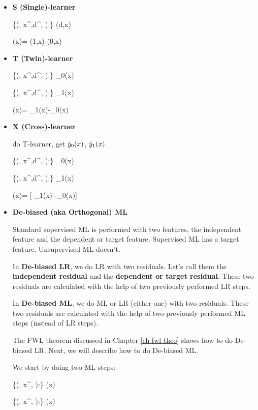\begin{itemize}
\item {\bf S (Single)-learner}

\beq
\{(\s, x^\s,d^\s,  ):\s\in \Sigma\}
\mlarr \haty(d,x)
\eeq

\beq
\delta(x)= \haty(1,x)-\haty(0,x)
\eeq

\item {\bf T (Twin)-learner}

\beq
\{(\s, x^\s,d^,  ):\s\in \Sigma\}
\mlarr \haty_0(x)
\eeq

\beq
\{(\s, x^\s,d^,  ):\s\in \Sigma\}
\mlarr \haty_1(x)
\eeq

\beq
\delta(x)= \haty_1(x)-\haty_0(x)
\eeq

\item {\bf X (Cross)-learner}

do T-learner, get ${\hat{y}}_0(x)$, ${\hat{y}}_1(x)$


\beq
\{(\s, x^\s,d^, ):\s\in \Sigma\}
\mlarr \caly_0(x)
\eeq

\beq
\{(\s, x^\s,d^, ):\s\in \Sigma\}
\mlarr \caly_1(x)
\eeq

\beq
\delta(x)= [
\caly_1(x) -\caly_0(x)]
\eeq

\item {\bf De-biased (aka Orthogonal) ML}

Standard supervised ML is performed with two features,
the independent feature and the dependent or target feature.
Supervised ML has a target feature. Unsupervised ML doesn't.


In {\bf De-biased LR}, we
do LR
with two residuals. Let's call them
the {\bf independent residual} and the
{\bf dependent or target residual}.
These  two residuals are calculated
with the help of two previously
performed LR steps.


In {\bf De-biased ML},
we do ML or LR (either one) with two residuals.
These  two residuals are calculated
with the help of two previously
performed ML steps (instead of LR steps).

The FWL theorem
discussed in Chapter \ref{ch-fwl-theo}
shows how to do De-biased LR. Next,
we will describe how to 
do De-biased ML.

We start by doing two ML steps:

\beq
\{(\s, x^\s, ):\s\in \Sigma\}
\mlarr {}(x)
\eeq

\beq
\{(\s, x^\s, ):\s\in \Sigma\}
\mlarr \haty(x)
\eeq


\end{itemize}
